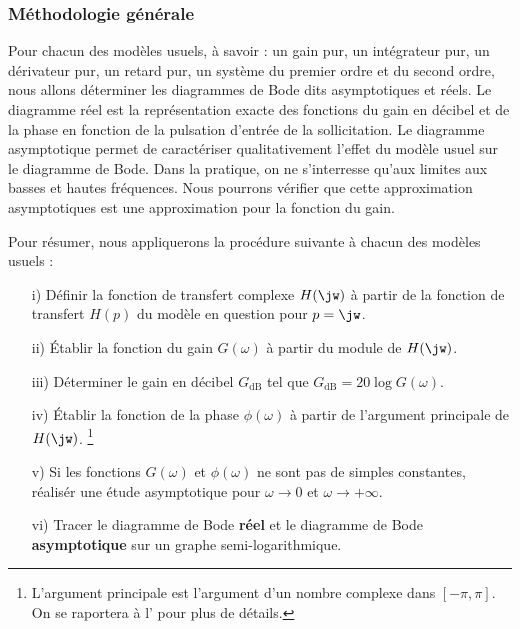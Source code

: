 \subsubsection*{Méthodologie générale}
Pour chacun des modèles usuels, à savoir : un gain pur, un intégrateur pur,
un dérivateur pur, un retard pur, un système du premier ordre et du second 
ordre, nous allons déterminer les diagrammes de Bode dits asymptotiques 
et réels. Le diagramme réel est la représentation exacte des fonctions du gain
en décibel et de la phase en fonction de la pulsation d'entrée de 
la sollicitation. Le diagramme asymptotique permet de caractériser 
qualitativement l'effet du modèle usuel sur le diagramme de Bode. 
Dans la pratique, on ne s'interresse qu'aux limites aux basses et hautes 
fréquences. Nous pourrons vérifier que cette approximation asymptotiques est une
approximation pour la fonction du gain.

Pour résumer, nous appliquerons la procédure suivante à chacun des modèles 
usuels :
\begin{itemize}
    \item[i)] Définir la fonction de transfert complexe $H(\jw)$ à partir de la 
          fonction de transfert $H(p)$ du modèle en question pour $p=\jw$.
    \item[ii)] \'Etablir la fonction du gain $G(\omega)$ à partir du 
          module de $H(\jw)$.
    \item[iii)] Déterminer le gain en décibel $G_{\si{\dB}}$ tel que 
        $G_{\si{\dB}}=20\log{G(\omega)}$.
    \item[iv)] \'Etablir la fonction de la phase $\phi(\omega)$ à partir de 
        l'argument principale de $H(\jw)$.
        \footnote{L'argument principale est l'argument d'un nombre complexe 
        dans $[-\pi,\pi]$. On se raportera à l' pour plus 
        de détails.}
    \item[v)] Si les fonctions $G(\omega)$ et $\phi(\omega)$ ne sont pas de 
          simples constantes, réalisér une étude
          asymptotique pour $\omega\rightarrow 0$ et 
          $\omega\rightarrow +\infty$.
    \item[vi)] Tracer le diagramme de Bode \textbf{réel} et le diagramme 
          de Bode \textbf{asymptotique} sur un graphe semi-logarithmique.
\end{itemize}
